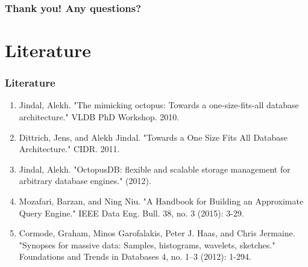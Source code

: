 \documentclass{beamer}
\begin{document}
\begin{frame}
 \frametitle{Thank you! Any questions?}
\end{frame}

\section{Literature}
\begin{frame}
\frametitle{Literature}
\begin{enumerate}
\item{Jindal, Alekh. "The mimicking octopus: Towards a one-size-fits-all database architecture." VLDB PhD Workshop. 2010.}
\item{Dittrich, Jens, and Alekh Jindal. "Towards a One Size Fits All Database Architecture." CIDR. 2011.}
\item{Jindal, Alekh. "OctopusDB: flexible and scalable storage management for arbitrary database engines." (2012).}
\item{Mozafari, Barzan, and Ning Niu. "A Handbook for Building an Approximate Query Engine." IEEE Data Eng. Bull. 38, no. 3 (2015): 3-29.}
\item{Cormode, Graham, Minos Garofalakis, Peter J. Haas, and Chris Jermaine. "Synopses for massive data: Samples, histograms, wavelets, sketches." Foundations and Trends in Databases 4, no. 1–3 (2012): 1-294.}
\end{enumerate}
\end{frame}
\end{document}
